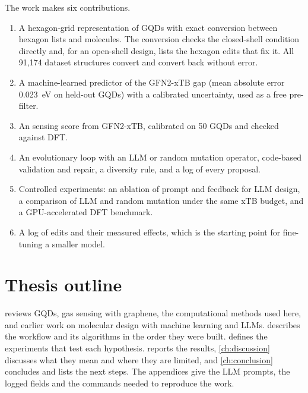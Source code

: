 The work makes six contributions.
\begin{enumerate}
  \item A hexagon-grid representation of GQDs with exact conversion between hexagon lists and
        molecules. The conversion checks the closed-shell condition directly and, for an
        open-shell design, lists the hexagon edits that fix it. All 91{,}174 dataset structures
        convert and convert back without error.
  \item A machine-learned predictor of the GFN2-xTB gap (mean absolute error 0.023~eV on held-out
        GQDs) with a calibrated uncertainty, used as a free pre-filter.
  \item An  sensing score from GFN2-xTB, calibrated on 50 GQDs and checked against DFT.
  \item An evolutionary loop with an LLM or random mutation operator, code-based validation and
        repair, a diversity rule, and a log of every proposal.
  \item Controlled experiments: an ablation of prompt and feedback for LLM design, a comparison of
        LLM and random mutation under the same xTB budget, and a GPU-accelerated DFT benchmark.
  \item A log of edits and their measured effects, which is the starting point for fine-tuning a
        smaller model.
\end{enumerate}

\section{Thesis outline}

 reviews GQDs, gas sensing with graphene, the computational methods used here,
and earlier work on molecular design with machine learning and LLMs.  describes
the workflow and its algorithms in the order they were built.  defines the
experiments that test each hypothesis.  reports the results, \cref{ch:discussion}
discusses what they mean and where they are limited, and \cref{ch:conclusion} concludes and lists
the next steps. The appendices give the LLM prompts, the logged fields and the commands needed to
reproduce the work.
